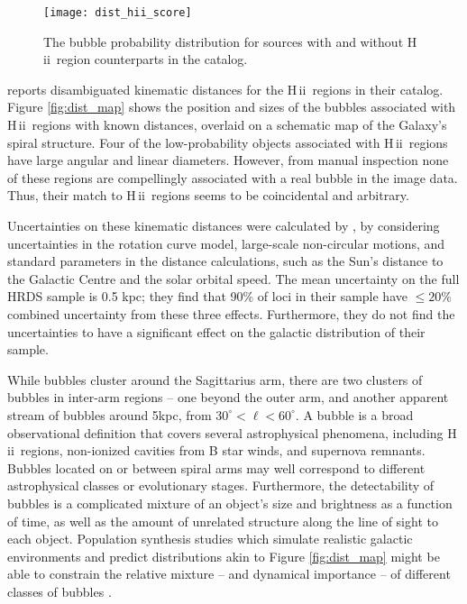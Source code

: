 \documentclass[preprint]{aastex}
\newcommand{\hii}[0]{{\sc H\,ii}}
\begin{document}
\begin{figure}[h!]
\texttt{[image: dist\_hii\_score]}
\caption{The bubble probability distribution for sources with and without \hii\, region counterparts in the \cite{Anderson11} catalog.}
\label{fig:hii_score}
\end{figure}

\cite{Anderson12} reports disambiguated kinematic distances for the \hii\, regions in their catalog. Figure \ref{fig:dist_map} shows the position and sizes of the bubbles associated with \hii\, regions with known distances, overlaid on a schematic map of the Galaxy's spiral structure. Four of the low-probability objects associated with \hii\, regions have large angular and linear diameters. However, from manual inspection none of these regions are compellingly associated with a real bubble in the image data. Thus, their match to \hii\, regions seems to be coincidental and arbitrary.

Uncertainties on these kinematic distances were calculated by \cite{Anderson12}, by considering uncertainties in the rotation curve model, large-scale non-circular motions, and standard parameters in the distance calculations, such as the Sun's distance to the Galactic Centre and the solar orbital speed. The mean uncertainty on the full HRDS sample is 0.5 kpc; they find that 90\% of loci in their sample have $\leq 20\%$ combined uncertainty from these three effects. Furthermore, they do not find the uncertainties to have a significant effect on the galactic distribution of their sample. 

While bubbles cluster around the Sagittarius arm, there are two clusters of bubbles in inter-arm regions -- one beyond the outer arm, and another apparent stream of bubbles around 5kpc, from $30^\circ < \ell < 60^\circ$. A bubble is a broad observational definition that covers several astrophysical phenomena, including \hii\, regions, non-ionized cavities from B star winds, and supernova remnants. Bubbles located on or between spiral arms may well correspond to different astrophysical classes or evolutionary stages. Furthermore, the detectability of bubbles is a complicated mixture of an object's size and brightness as a function of time, as well as the amount of unrelated structure along the line of sight to each object. Population synthesis studies which simulate realistic galactic environments and predict distributions akin to Figure \ref{fig:dist_map} might be able to constrain the relative mixture -- and dynamical importance -- of different classes of bubbles \citep{Robin03,Robitaille12}.
\end{document}
